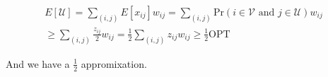 \documentclass{article}
\begin{document}
\begin{gather*}
  E[\mathcal{U}] = \sum_{(i,j)}E[x_{ij}]w_{ij} = \sum_{(i,j)} \text{Pr}(i \in \mathcal{V} \text{ and }  j \in \mathcal{U})w_{ij}\\
  \geq \sum_{(i,j)}\frac{z_{ij}}{2}w_{ij} = \frac{1}{2}\sum_{(i,j)}z_{ij}w_{ij} \geq \frac{1}{2} \text{OPT}
\end{gather*}

\noindent And we have a $\frac{1}{2}$ appromixation.
\end{document}
